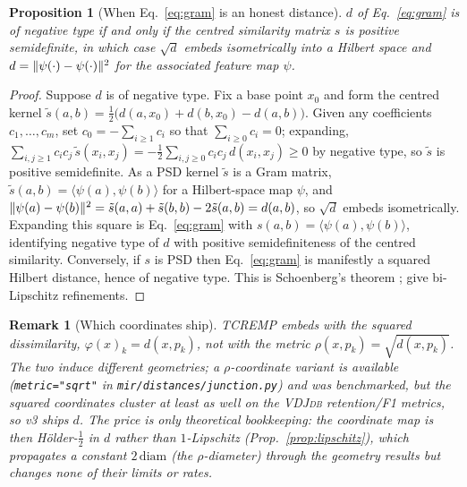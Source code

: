 \documentclass[11pt]{article}
\theoremstyle{oldplain}
\newtheorem{proposition}{Proposition}
\theoremstyle{oldrem}
\newtheorem{remark}{Remark}
\newcommand{\code}[1]{\texttt{#1}}
\DeclarePairedDelimiter{\norm}{\lVert}{\rVert}
\begin{document}
\begin{proposition}[When Eq.~\eqref{eq:gram} is an honest distance]\label{prop:schoenberg}
$d$ of Eq.~\eqref{eq:gram} is of negative type if and only if the centred similarity matrix
$s$ is positive semidefinite, in which case $\sqrt d$ embeds isometrically into a Hilbert space
and $d=\norm{\psi(\cdot)-\psi(\cdot)}^2$ for the associated feature map $\psi$.
\end{proposition}
\begin{proof}
Suppose $d$ is of negative type. Fix a base point $x_0$ and form the centred kernel
$\tilde s(a,b)=\tfrac12\big(d(a,x_0)+d(b,x_0)-d(a,b)\big)$. Given any coefficients $c_1,\dots,c_m$, set
$c_0=-\sum_{i\ge1}c_i$ so that $\sum_{i\ge0}c_i=0$; expanding, $\sum_{i,j\ge1}c_ic_j\,\tilde s(x_i,x_j)
=-\tfrac12\sum_{i,j\ge0}c_ic_j\,d(x_i,x_j)\ge0$ by negative type, so $\tilde s$ is positive semidefinite. As a
PSD kernel $\tilde s$ is a Gram matrix, $\tilde s(a,b)=\langle\psi(a),\psi(b)\rangle$ for a Hilbert-space map
$\psi$, and $\norm{\psi(a)-\psi(b)}^2=\tilde s(a,a)+\tilde s(b,b)-2\tilde s(a,b)=d(a,b)$, so $\sqrt d$ embeds
isometrically. Expanding this square is Eq.~\eqref{eq:gram} with $s(a,b)=\langle\psi(a),\psi(b)\rangle$,
identifying negative type of $d$ with positive semidefiniteness of the centred similarity. Conversely, if $s$
is PSD then Eq.~\eqref{eq:gram} is manifestly a squared Hilbert distance, hence of negative type. This is
Schoenberg's theorem \cite{Schoenberg1938}; \cite{NegativeTypeHilbert2023,CNDkernels2013} give bi-Lipschitz
refinements.
\end{proof}

\begin{remark}[Which coordinates ship]\label{rem:whichcoords}
{\scshape TCREMP} embeds with the \emph{squared} dissimilarity, $\varphi(x)_k=d(x,p_k)$, not with the
metric $\rho(x,p_k)=\sqrt{d(x,p_k)}$. The two induce different geometries; a $\rho$-coordinate variant is
available (\code{metric="sqrt"} in \code{mir/distances/junction.py}) and was benchmarked, but the squared
coordinates cluster at least as well on the {\scshape VDJdb} retention/F1 metrics, so v3 ships $d$. The
price is only theoretical bookkeeping: the coordinate map is then H\"older-$\tfrac12$ in $d$ rather than
$1$-Lipschitz (Prop.~\ref{prop:lipschitz}), which propagates a constant $2\,\mathrm{diam}$ (the $\rho$-diameter)
through the geometry results but changes none of their limits or rates.
\end{remark}
\end{document}

